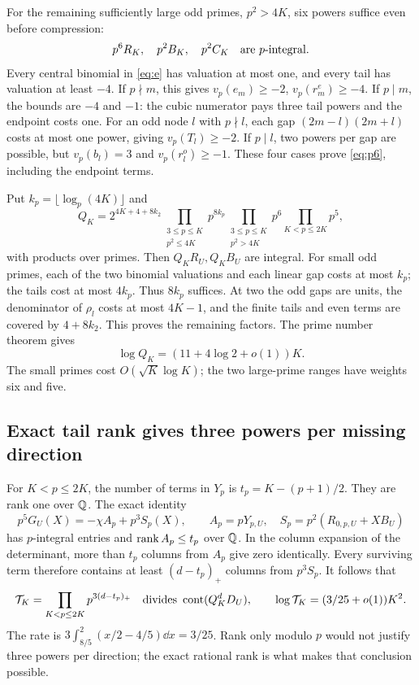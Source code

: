 For the remaining sufficiently large odd primes, $p^2>4K$, six powers
suffice even before compression:
\begin{equation}\label{eq:p6}
 p^6R_K,\quad p^2B_K,\quad p^2C_K
 \quad\hbox{are $p$-integral}.
\end{equation}
Every central binomial in \eqref{eq:e} has valuation at most one,
and every tail has valuation at least $-4$. If $p\nmid m$, this
gives $v_p(e_m)\geq-2$, $v_p(r_m^e)\geq-4$. If $p\mid m$,
the bounds are $-4$ and $-1$: the cubic numerator pays three tail
powers and the endpoint costs one. For an odd node $l$ with
$p\nmid l$, each gap $(2m-l)(2m+l)$ costs at most one power, giving
$v_p(T_l)\geq-2$. If $p\mid l$, two powers per gap are possible,
but $v_p(b_l)=3$ and $v_p(r_l^o)\geq-1$. These four cases prove
\eqref{eq:p6}, including the endpoint terms.

Put $k_p=\lfloor\log_p(4K)\rfloor$ and
\begin{equation}\label{eq:Qclear}
 Q_K=2^{4K+4+8k_2}
 \prod_{\substack{3\leq p\leq K\\p^2\leq4K}}p^{8k_p}
 \prod_{\substack{3\leq p\leq K\\p^2>4K}}p^6
 \prod_{K<p\leq2K}p^5,
\end{equation}
with products over primes. Then $Q_KR_U,Q_KB_U$ are integral.
For small odd primes, each of the two binomial valuations and each
linear gap costs at most $k_p$; the tails cost at most $4k_p$.
Thus $8k_p$ suffices. At two the odd gaps are units, the denominator
of $\rho_l$ costs at most $4K-1$, and the finite tails and even
terms are covered by $4+8k_2$. This proves the remaining factors.
The prime number theorem gives
\begin{equation}\label{eq:Qrate}
 \log Q_K=(11+4\log2+o(1))K.
\end{equation}
The small primes cost $O(\sqrt K\log K)$; the two large-prime ranges
have weights six and five.

\subsection{Exact tail rank gives three powers per missing direction}
For $K<p\leq2K$, the number of terms in $Y_p$ is
$t_p=K-(p+1)/2$. They are rank one over $\mathbb Q$. The exact identity
\[
 p^5G_U(X)=-\chi A_p+p^3S_p(X),\qquad
 A_p=pY_{p,U},\quad S_p=p^2(R_{0,p,U}+XB_U)
\]
has $p$-integral entries and $\operatorname{rank} A_p\leq t_p$ over $\mathbb Q$.
In the column expansion of the determinant, more than $t_p$ columns
from $A_p$ give zero identically. Every surviving term therefore
contains at least $(d-t_p)_+$ columns from $p^3S_p$. It follows that
\begin{equation}\label{eq:tailcontent}
 \mathcal T_K=\prod_{K<p\leq2K}p^{3(d-t_p)_+}
 \quad\hbox{divides }\operatorname{cont}(Q_K^dD_U),\qquad
 \log\mathcal T_K=(3/25+o(1))K^2.
\end{equation}
The rate is $3\int_{8/5}^2(x/2-4/5)\dd x=3/25$.
Rank only modulo $p$ would not justify three powers per direction;
the exact rational rank is what makes that conclusion possible.

